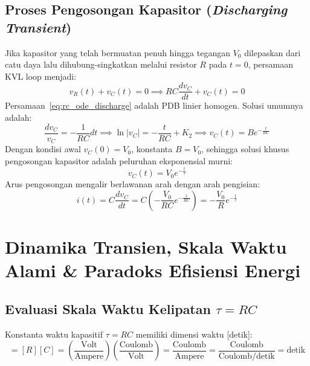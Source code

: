 \documentclass[11pt,a4paper]{article}
\theoremstyle{definition}
\begin{document}
\subsection{Proses Pengosongan Kapasitor (\textit{Discharging Transient})}
Jika kapasitor yang telah bermuatan penuh hingga tegangan $V_0$ dilepaskan dari catu daya lalu dihubung-singkatkan melalui resistor $R$ pada $t = 0$, persamaan KVL loop menjadi:
\begin{equation}
    v_R(t) + v_C(t) = 0 \implies R C \frac{dv_C}{dt} + v_C(t) = 0
    \label{eq:rc_ode_discharge}
\end{equation}
Persamaan~\eqref{eq:rc_ode_discharge} adalah PDB linier homogen. Solusi umumnya adalah:
\begin{equation}
    \frac{dv_C}{v_C} = -\frac{1}{RC} dt \implies \ln|v_C| = -\frac{t}{RC} + K_2 \implies v_C(t) = B e^{-\frac{t}{RC}}
\end{equation}
Dengan kondisi awal $v_C(0) = V_0$, konstanta $B = V_0$, sehingga solusi khusus pengosongan kapasitor adalah peluruhan eksponensial murni:
\begin{equation}
    v_C(t) = V_0 e^{-\frac{t}{\tau}}
    \label{eq:vc_discharge_solution}
\end{equation}
Arus pengosongan mengalir berlawanan arah dengan arah pengisian:
\begin{equation}
    i(t) = C \frac{dv_C}{dt} = C \left( -\frac{V_0}{RC} e^{-\frac{t}{RC}} \right) = -\frac{V_0}{R} e^{-\frac{t}{\tau}}
    \label{eq:ic_discharge_solution}
\end{equation}

\section{Dinamika Transien, Skala Waktu Alami \& Paradoks Efisiensi Energi}

\subsection{Evaluasi Skala Waktu Kelipatan \texorpdfstring{$\tau = RC$}{tau = RC}}
Konstanta waktu kapasitif $\tau = RC$ memiliki dimensi waktu [detik]:
\begin{equation}
    [\tau] = [R][C] = \left( \frac{\text{Volt}}{\text{Ampere}} \right) \left( \frac{\text{Coulomb}}{\text{Volt}} \right) = \frac{\text{Coulomb}}{\text{Ampere}} = \frac{\text{Coulomb}}{\text{Coulomb/detik}} = \text{detik}
\end{equation}
\end{document}
